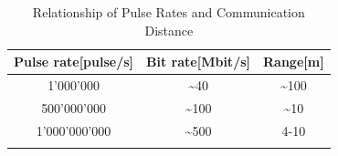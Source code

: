 \begin{table}
\caption{Relationship of Pulse Rates and Communication Distance}
\label{tab:pulse_rate_range}
\centering
\begin{tabular}{c c c}
\toprule
\textbf{Pulse rate}[pulse/s] & \textbf{Bit rate}[Mbit/s] & \textbf{Range}[m]\\
\midrule
1'000'000 & \textasciitilde40 & \textasciitilde100\\
500'000'000 & \textasciitilde100 & \textasciitilde10\\
1'000'000'000 & \textasciitilde500 & 4-10\\
\bottomrule\\
\end{tabular}
\end{table}








